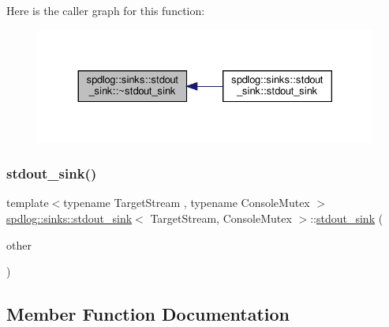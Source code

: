 Here is the caller graph for this function\+:
\nopagebreak
\begin{figure}[H]
\begin{center}
\leavevmode
\includegraphics[width=330pt]{classspdlog_1_1sinks_1_1stdout__sink_ae0e434d7d55f6ec9c05ff308bc8e673b_icgraph}
\end{center}
\end{figure}
\mbox{\label{classspdlog_1_1sinks_1_1stdout__sink_ab7761f533c069ef52a256573de29077d}} 
\subsubsection{\texorpdfstring{stdout\+\_\+sink()}{stdout\_sink()}\hspace{0.1cm}{\footnotesize\ttfamily [2/2]}}
{\footnotesize\ttfamily template$<$typename Target\+Stream , typename Console\+Mutex $>$ \\
\hyperlink{classspdlog_1_1sinks_1_1stdout__sink}{spdlog\+::sinks\+::stdout\+\_\+sink}$<$ Target\+Stream, Console\+Mutex $>$\+::\hyperlink{classspdlog_1_1sinks_1_1stdout__sink}{stdout\+\_\+sink} (\begin{DoxyParamCaption}\item[{const \hyperlink{classspdlog_1_1sinks_1_1stdout__sink}{stdout\+\_\+sink}$<$ Target\+Stream, Console\+Mutex $>$ \&}]{other }\end{DoxyParamCaption})\hspace{0.3cm}{\ttfamily [delete]}}



\subsection{Member Function Documentation}
\mbox{\label{classspdlog_1_1sinks_1_1stdout__sink_af3a13cc82215681bdd7ca5e33a7c28b5}} 
